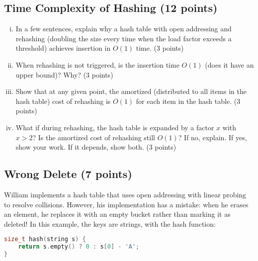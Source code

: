 \documentclass[11pt]{exam}
\begin{document}
\begin{solution}
\end{solution}

\subsection{Time Complexity of Hashing (12 points)}
\begin{enumerate}[i)]
\item In a few sentences, explain why a hash table with open addressing and rehashing (doubling the size every time when the load factor exceeds a threshold) achieves insertion in $O(1)$ time. (3 points)
\begin{solution}
\end{solution}
\item When rehashing is not triggered, is the insertion time $O(1)$ (does it have an upper bound)? Why? (3 points)
\begin{solution}
\end{solution}
\item Show that at any given point, the amortized (distributed to all items in the hash table) cost of rehashing is $O(1)$ for each item in the hash table. (3 points)
\begin{solution}
\end{solution}
\item What if during rehashing, the hash table is expanded by a factor $x$ with $x > 2$? Is the amortized cost of rehashing still $O(1)$? If no, explain. If yes, show your work. If it depends, show both. (3 points)
\begin{solution}
\end{solution}
\end{enumerate}

\subsection{Wrong Delete (7 points)}
William implements a hash table that uses open addressing with linear probing to resolve collisions. However, his implementation has a mistake: when he erases an element, he replaces it with an empty bucket rather than marking it as deleted! In this example, the keys are strings, with the hash function:
\begin{lstlisting}[language=c++]
size_t hash(string s) {
	return s.empty() ? 0 : s[0] - 'A';
}
\end{lstlisting}
\end{document}
